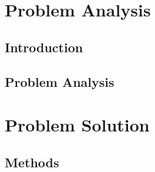 \fancyhf{}
\fancyfoot[C]{\thepage} %
\fancyhead[RE,LO]{}																												%
\fancyhead[RE,LO]{\color{aaublue}\small\nouppercase\leftmark} %
\pagestyle{fancy}



%
\part{Problem Analysis}
\chapter{Introduction} \label{chap:Introduction}


\chapter{Problem Analysis} \label{chap:Problem_analysis}









\part{Problem Solution}
\chapter{Methods}














